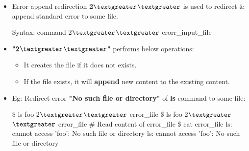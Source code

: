 \setlength{\columnsep}{3pt}
\begin{flushleft}

	\begin{itemize}
	\item Error append redirection \textbf{2{$\textgreater$}{$\textgreater$}} is used to redirect \& append standard error to some file.
	\bigskip
	\begin{tcolorbox}[breakable,notitle,boxrule=-0pt,colback=pink,colframe=pink]
		\color{black}
		\font=9pt
		Syntax: command 2{$\textgreater$}{$\textgreater$} erorr\_input\_file
		\font=4pt
	\end{tcolorbox}
	\item \textbf{"2{$\textgreater$}{$\textgreater$}"} performs below operations:
	\begin{itemize}
		\item It creates the file if it does not exists.
		\item If the file exists, it will \textbf{append} new content to the existing content.
	\end{itemize}
	\item
	Eg: Redirect error \textbf{"No such file or directory"} of \textbf{ls} command to some file:
	\bigskip
	\begin{tcolorbox}[breakable,notitle,boxrule=-0pt,colback=black,colframe=black]
		\color{green}
		\font=9pt
		\$ ls foo 2{$\textgreater$}{$\textgreater$} error\_file
		\newline
		\$ ls foo 2{$\textgreater$}{$\textgreater$} error\_file
		\newline
		\newline
		\color{yellow}
		\# Read content of error\_file
		\color{green}
		\newline
		\$ cat error\_file
		\newline
		\color{white}
		ls: cannot access 'foo': No such file or directory
		\newline
		ls: cannot access 'foo': No such file or directory
		\font=4pt
	\end{tcolorbox}

\end{itemize}
	

	
\end{flushleft}

